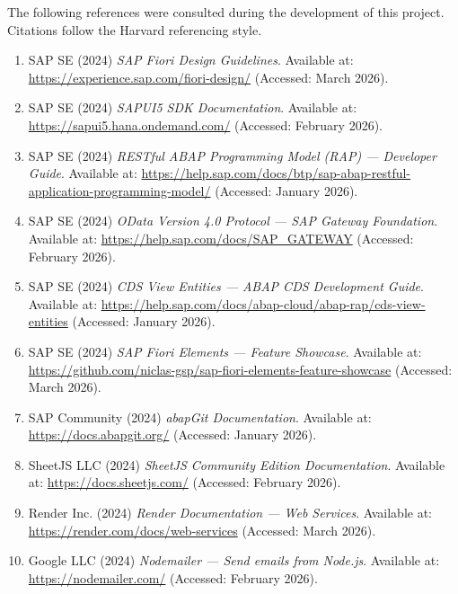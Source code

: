 \documentclass[12pt,a4paper]{report}
\begin{document}
The following references were consulted during the development of this project. Citations follow the Harvard referencing style.

\begin{enumerate}[leftmargin=2em]

  \item SAP SE (2024) \textit{SAP Fiori Design Guidelines}. Available at: \url{https://experience.sap.com/fiori-design/} (Accessed: March 2026).

  \item SAP SE (2024) \textit{SAPUI5 SDK Documentation}. Available at: \url{https://sapui5.hana.ondemand.com/} (Accessed: February 2026).

  \item SAP SE (2024) \textit{RESTful ABAP Programming Model (RAP) --- Developer Guide}. Available at: \url{https://help.sap.com/docs/btp/sap-abap-restful-application-programming-model/} (Accessed: January 2026).

  \item SAP SE (2024) \textit{OData Version 4.0 Protocol --- SAP Gateway Foundation}. Available at: \url{https://help.sap.com/docs/SAP_GATEWAY} (Accessed: February 2026).

  \item SAP SE (2024) \textit{CDS View Entities --- ABAP CDS Development Guide}. Available at: \url{https://help.sap.com/docs/abap-cloud/abap-rap/cds-view-entities} (Accessed: January 2026).

  \item SAP SE (2024) \textit{SAP Fiori Elements --- Feature Showcase}. Available at: \url{https://github.com/niclas-gsp/sap-fiori-elements-feature-showcase} (Accessed: March 2026).

  \item SAP Community (2024) \textit{abapGit Documentation}. Available at: \url{https://docs.abapgit.org/} (Accessed: January 2026).

  \item SheetJS LLC (2024) \textit{SheetJS Community Edition Documentation}. Available at: \url{https://docs.sheetjs.com/} (Accessed: February 2026).

  \item Render Inc. (2024) \textit{Render Documentation --- Web Services}. Available at: \url{https://render.com/docs/web-services} (Accessed: March 2026).

  \item Google LLC (2024) \textit{Nodemailer --- Send emails from Node.js}. Available at: \url{https://nodemailer.com/} (Accessed: February 2026).


\end{enumerate}
\end{document}
